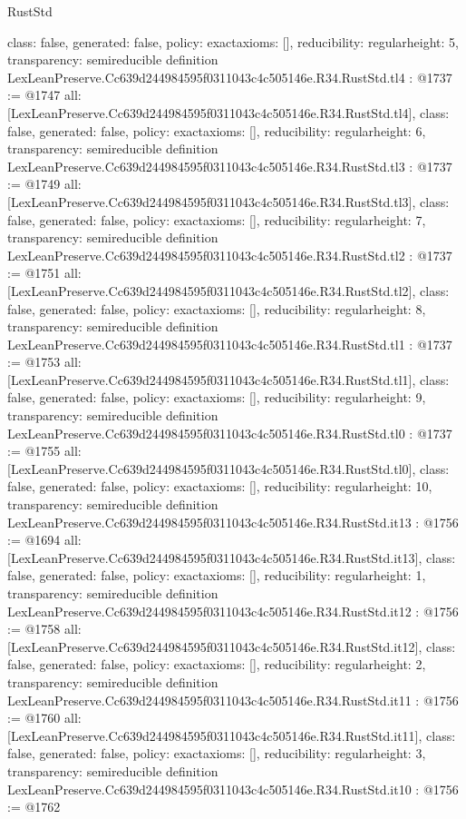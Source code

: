 \begin{lexlean}{RustStd}
\begin{coremodule}
{  class: false,
  generated: false,
  policy: exact{axioms: []},
  reducibility: regular{height: 5},
  transparency: semireducible
}
definition LexLeanPreserve.Cc639d244984595f0311043c4c505146e.R34.RustStd.tl4 : @1737 := @1747 {
  all: [LexLeanPreserve.Cc639d244984595f0311043c4c505146e.R34.RustStd.tl4],
  class: false,
  generated: false,
  policy: exact{axioms: []},
  reducibility: regular{height: 6},
  transparency: semireducible
}
definition LexLeanPreserve.Cc639d244984595f0311043c4c505146e.R34.RustStd.tl3 : @1737 := @1749 {
  all: [LexLeanPreserve.Cc639d244984595f0311043c4c505146e.R34.RustStd.tl3],
  class: false,
  generated: false,
  policy: exact{axioms: []},
  reducibility: regular{height: 7},
  transparency: semireducible
}
definition LexLeanPreserve.Cc639d244984595f0311043c4c505146e.R34.RustStd.tl2 : @1737 := @1751 {
  all: [LexLeanPreserve.Cc639d244984595f0311043c4c505146e.R34.RustStd.tl2],
  class: false,
  generated: false,
  policy: exact{axioms: []},
  reducibility: regular{height: 8},
  transparency: semireducible
}
definition LexLeanPreserve.Cc639d244984595f0311043c4c505146e.R34.RustStd.tl1 : @1737 := @1753 {
  all: [LexLeanPreserve.Cc639d244984595f0311043c4c505146e.R34.RustStd.tl1],
  class: false,
  generated: false,
  policy: exact{axioms: []},
  reducibility: regular{height: 9},
  transparency: semireducible
}
definition LexLeanPreserve.Cc639d244984595f0311043c4c505146e.R34.RustStd.tl0 : @1737 := @1755 {
  all: [LexLeanPreserve.Cc639d244984595f0311043c4c505146e.R34.RustStd.tl0],
  class: false,
  generated: false,
  policy: exact{axioms: []},
  reducibility: regular{height: 10},
  transparency: semireducible
}
definition LexLeanPreserve.Cc639d244984595f0311043c4c505146e.R34.RustStd.it13 : @1756 := @1694 {
  all: [LexLeanPreserve.Cc639d244984595f0311043c4c505146e.R34.RustStd.it13],
  class: false,
  generated: false,
  policy: exact{axioms: []},
  reducibility: regular{height: 1},
  transparency: semireducible
}
definition LexLeanPreserve.Cc639d244984595f0311043c4c505146e.R34.RustStd.it12 : @1756 := @1758 {
  all: [LexLeanPreserve.Cc639d244984595f0311043c4c505146e.R34.RustStd.it12],
  class: false,
  generated: false,
  policy: exact{axioms: []},
  reducibility: regular{height: 2},
  transparency: semireducible
}
definition LexLeanPreserve.Cc639d244984595f0311043c4c505146e.R34.RustStd.it11 : @1756 := @1760 {
  all: [LexLeanPreserve.Cc639d244984595f0311043c4c505146e.R34.RustStd.it11],
  class: false,
  generated: false,
  policy: exact{axioms: []},
  reducibility: regular{height: 3},
  transparency: semireducible
}
definition LexLeanPreserve.Cc639d244984595f0311043c4c505146e.R34.RustStd.it10 : @1756 := @1762 {
}
\end{coremodule}
\end{lexlean}
